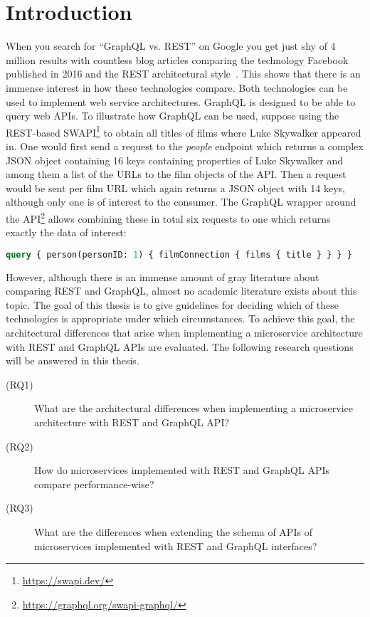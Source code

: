 \section{Introduction}\label{sec:introduction}

When you search for ``GraphQL vs. \acs{REST}'' on Google you get just shy of 4 million results with countless blog articles comparing the technology Facebook published in 2016 and the \acf{REST} architectural style~\cite{Brito2019}.
This shows that there is an immense interest in how these technologies compare.
Both technologies can be used to implement web service architectures.
GraphQL is designed to be able to query web \acp{API}.
To illustrate how GraphQL can be used, suppose using the \ac{REST}-based \ac{SWAPI}\footnote{\url{https://swapi.dev/}} to obtain all titles of films where Luke Skywalker appeared in.
One would first send a request to the \textit{people} endpoint which returns a complex \ac{JSON} object containing 16 keys containing properties of Luke Skywalker and among them a list of the \acp{URL} to the film objects of the \ac{API}.
Then a request would be sent per film \ac{URL} which again returns a \ac{JSON} object with 14 keys, although only one is of interest to the consumer.
The GraphQL wrapper around the \ac{API}\footnote{\url{https://graphql.org/swapi-graphql/}} allows combining these in total six requests to one which returns exactly the data of interest:
\begin{lstlisting}[language=graphql]
query { person(personID: 1) { filmConnection { films { title } } } }
\end{lstlisting}



However, although there is an immense amount of gray literature about comparing \ac{REST} and GraphQL, almost no academic literature exists about this topic.
The goal of this thesis is to give guidelines for deciding which of these technologies is appropriate under which circumstances.
To achieve this goal, the architectural differences that arise when implementing a microservice architecture with \ac{REST} and GraphQL \acp{API} are evaluated.
The following research questions will be answered in this thesis.

\begin{description}
    \item[(RQ1)] What are the architectural differences when implementing a microservice architecture with \ac{REST} and GraphQL \ac{API}?
    \item[(RQ2)] How do microservices implemented with \ac{REST} and GraphQL \acp{API} compare performance-wise?
    \item[(RQ3)] What are the differences when extending the schema of \acp{API} of microservices implemented with \ac{REST} and GraphQL interfaces?  
\end{description}

